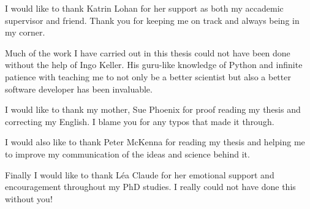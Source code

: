 I would like to thank Katrin Lohan for her support as both my accademic supervisor and friend. Thank you for keeping me on track and always being in my corner.

Much of the work I have carried out in this thesis could not have been done without the help of Ingo Keller. His guru-like knowledge of Python and infinite patience with teaching me to not only be a better scientist but also a better software developer has been invaluable.

I would like to thank my mother, Sue Phoenix for proof reading my thesis and correcting my English. I blame you for any typos that made it through. 

I would also like to thank Peter McKenna for reading my thesis and helping me to improve my communication of the ideas and science behind it.


Finally I would like to thank L\' ea Claude for her emotional support and encouragement throughout my PhD studies. I really could not have done this without you!